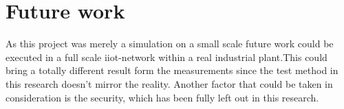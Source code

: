 \section{Future work} \label{future work}

As this project was merely a simulation on a small scale future work could be executed in a full scale \acrshort{iiot}-network within a real industrial plant.This could bring a totally different result form the measurements since the test method in this research doesn't mirror the reality. Another factor that could be taken in consideration is the security, which has been fully left out in this research.